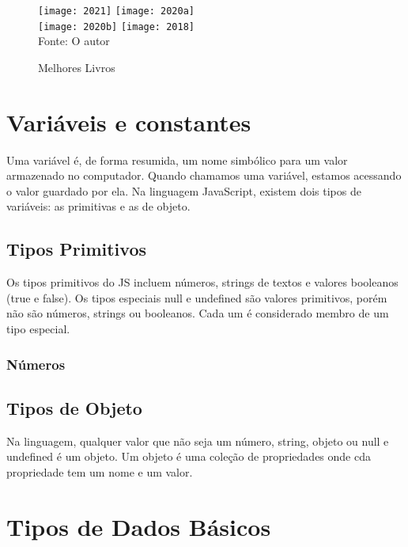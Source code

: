    \begin{figure}[H]
    \begin{center}
        \caption{Melhores Livros} \label{livros}
        \texttt{[image: 2021]} \texttt{[image: 2020a]}\\
                \texttt{[image: 2020b]} \texttt{[image: 2018]}\\
        {\tiny \sf Fonte: O autor }
    \end{center}
   \end{figure} 
    \section{Vari\'{a}veis e constantes}
    Uma variável é, de forma resumida, um nome simbólico para um valor armazenado no computador. Quando chamamos uma variável, estamos acessando o valor guardado por ela. \newline
    Na linguagem JavaScript, existem dois tipos de variáveis: as primitivas e as de objeto. 
    
    \subsection{Tipos Primitivos}
    
	Os tipos primitivos do JS incluem números, strings de textos e valores booleanos (true e false).
	Os tipos especiais null e undefined são valores primitivos, porém não são números, strings ou booleanos. Cada um é considerado membro de um tipo especial.  
	\subsubsection{Números}
	\subsection{Tipos de Objeto}
	Na linguagem, qualquer valor que não seja um número, string, objeto ou null e undefined é um objeto. Um objeto é uma coleção de propriedades onde cda propriedade tem um nome e um valor.
	


    \section{Tipos de Dados B\'{a}sicos}

